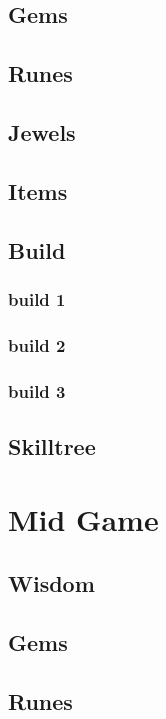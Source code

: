 \documentclass[14pt]{article}
\begin{document}
\subsection{Gems}

\subsection{Runes}

\subsection{Jewels}

\subsection{Items}

\subsection{Build}

\subsubsection{build 1}

\subsubsection{build 2}

\subsubsection{build 3}

\subsection{Skilltree}


\newpage

\section{Mid Game}
\subsection{Wisdom}
\subsection{Gems}
\subsection{Runes}
\end{document}
